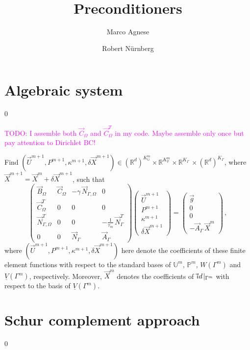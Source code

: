 \documentclass[a4paper,12pt,onecolumn]{article}
\title{Preconditioners}
\author{Marco Agnese \and Robert N\"urnberg}
\newcommand{\R}{{\mathbb R}}
\newcommand{\Vh}{\underline{V}(\Gamma^m)}
\newcommand{\Wh}{W(\Gamma^m)}
\newcommand{\uspace}{\mathbb{U}}
\newcommand{\pspace}{\mathbb{P}}
\newcommand{\id}{\rm id}
\newcommand{\NbulkT}{\vec{N}_{\Gamma,\Omega}^T}
\newcommand{\Nbulk}{\vec{N}_{\Gamma,\Omega}}
\begin{document}
\maketitle

\section{Algebraic system}\label{sec:algebraic_system}
\setcounter{equation} 0

\textcolor{magenta}{TODO: I assemble both $\vec C_\Omega$ and $\vec C^T_\Omega$ 
in my code. Maybe assemble only once but pay attention to Dirichlet BC!}

Find $(\vec U^{m+1},P^{m+1}, \kappa^{m+1},\delta\vec{X}^{m+1})\in
(\R^d)^{K^m_\uspace}\times \R^{K^m_\pspace} \times \R^{K_\Gamma}\,\times
(\R^d)^{K_\Gamma}$, where $\vec X^{m+1} = \vec X^m+ \delta\vec X^{m+1}$, such
that
\begin{equation}
\begin{pmatrix}
\vec B_\Omega & \vec C_\Omega & -\gamma\,\Nbulk & 0 \\
\vec C^T_\Omega & 0 & 0 & 0 \\
\NbulkT & 0 & 0 & -\frac1{\tau_m}\,\vec{N}_\Gamma^T \\
0 & 0 & \vec{N}_\Gamma & \vec{A}_\Gamma
\end{pmatrix}
\begin{pmatrix}
\vec U^{m+1} \\
P^{m+1} \\
\kappa^{m+1} \\
\delta\vec{X}^{m+1}
\end{pmatrix}
=
\begin{pmatrix}
\vec g \\
0 \\
0 \\
-\vec{A}_\Gamma\,\vec{X}^{m}
\end{pmatrix} \,,
\label{eq:lin}
\end{equation}
where $(\vec U^{m+1},P^{m+1},\kappa^{m+1},\delta\vec{X}^{m+1})$ here denote the
coefficients of these finite element functions with respect to the standard
bases of $\uspace^m$, $\pspace^m$, $\Wh$ and $\Vh$, respectively. Moreover,
$\vec X^m$ denotes the coefficients of $\vec\id\!\mid_{\Gamma^m}$ with respect
to the basis of $\Vh$.

\section{Schur complement approach}\label{sec:shur}
\setcounter{equation} 0
\end{document}

